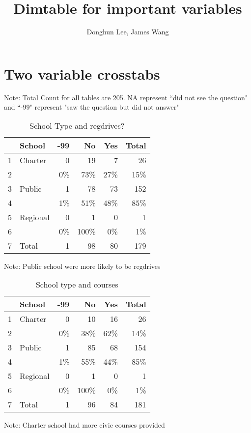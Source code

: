 \documentclass[12pt]{article}
\begin{document}
\title{Dimtable for important variables}
\author{Donghun Lee, James Wang}
\maketitle

\section{Two variable crosstabs}
Note: Total Count for all tables are 205. NA represent ``did not see the question" and ``-99" represent "saw the question but did not answer" 

\begin{table}[ht]
\begin{threeparttable}
\caption{School Type and regdrives?} 
\centering
\begin{tabular}{llrrrr}
  \hline
 & School & -99 & No & Yes & Total \\ 
  \hline
1 & Charter & 0 & 19 & 7 & 26 \\ 
  2 &   & 0\% & 73\% & 27\% & 15\% \\ 
  3 & Public & 1 & 78 & 73 & 152 \\ 
  4 &   & 1\% & 51\% & 48\% & 85\% \\ 
  5 & Regional & 0 & 1 & 0 & 1 \\ 
  6 &   & 0\% & 100\% & 0\% & 1\% \\ 
  7 & Total & 1 & 98 & 80 & 179 \\ 
   \hline
\end{tabular}
\begin{tablenotes}
      \small
      \item Note: Public school were more likely to be regdrives
    \end{tablenotes}
\end{threeparttable}
\end{table}

\begin{table}[ht]
\centering
\caption{School type and courses} 
\begin{tabular}{llrrrr}
  \hline
 & School & -99 & No & Yes & Total \\ 
  \hline
1 & Charter & 0 & 10 & 16 & 26 \\ 
  2 &   & 0\% & 38\% & 62\% & 14\% \\ 
  3 & Public & 1 & 85 & 68 & 154 \\ 
  4 &   & 1\% & 55\% & 44\% & 85\% \\ 
  5 & Regional & 0 & 1 & 0 & 1 \\ 
  6 &   & 0\% & 100\% & 0\% & 1\% \\ 
  7 & Total & 1 & 96 & 84 & 181 \\ 
   \hline
\end{tabular}
\begin{tablenotes}
      \small
      \item Note: Charter school had more civic courses provided
    \end{tablenotes}
\end{table}
\end{document}
